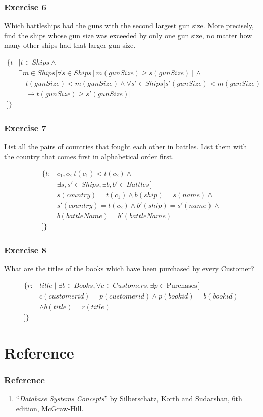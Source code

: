 \documentclass{beamer}
\begin{document}
\begin{frame}[fragile]
\frametitle{Exercise 6}
Which battleships had the guns with the second largest gun size. More precisely, find the ships whose gun size was exceeded by only one gun size, no matter how many other ships had that larger gun size. 

\begin{align*}
\{t&| t\in Ships \wedge \\ 
&\exists m \in Ships \Big[\forall s\in Ships [m(gunSize)\geq s(gunSize)] \wedge  \\
& \quad t(gunSize) < m(gunSize) \wedge \forall s' \in Ships [s'(gunSize)< m(gunSize)  \\
& \quad \rightarrow t(gunSize)\geq s'(gunSize)]\\
\Big]\}
\end{align*}
\end{frame}

\begin{frame}[fragile]
\frametitle{Exercise 7}
List all the pairs of countries that fought each other in battles. List them with the country that comes first in alphabetical order first\footnotemark {}.

\begin{align*}
\{t:&c_1, c_2| t(c_1)<t(c_2) \wedge \\ 
&\exists s, s'\in Ships, \exists b, b' \in Battles \Big[\\
& s(country)=t(c_1) \wedge b(ship) =s(name) \wedge \\
& s'(country)=t(c_2) \wedge b'(ship) =s'(name) \wedge \\
& b(battleName) = b'(battleName) \\
\Big]\}
\end{align*}
\end{frame}

\begin{frame}[fragile]
\frametitle{Exercise 8}
What are the titles of the books which have been purchased by every Customer?

\begin{align*}
\{r:&title \mid \exists b \in Books, \forall c \in Customers, \exists p \in \text{Purchases} [\\
  &c(customerid) = p(customerid) \land  p(bookid) = b(bookid) \\
  &\land b(title) = r(title)\\
]\}
\end{align*}

\end{frame}
\section{Reference}
\begin{frame}[fragile]
\frametitle{Reference}
\begin{enumerate}
\item ``\textit{Database Systems Concepts}'' by Silberschatz, Korth and Sudarshan, 6th edition, McGraw-Hill.
\end{enumerate}
\end{frame}
\end{document}
